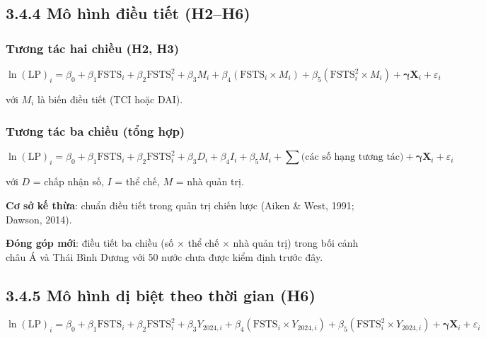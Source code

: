 \documentclass[
  a4paper,
  13pt]{extreport}
\begin{document}
\hypertarget{muxf4-huxecnh-ux111iux1ec1u-tiux1ebft-h2h6}{%
\subsection{3.4.4 Mô hình điều tiết
(H2--H6)}\label{muxf4-huxecnh-ux111iux1ec1u-tiux1ebft-h2h6}}

\hypertarget{tux1b0ux1a1ng-tuxe1c-hai-chiux1ec1u-h2-h3}{%
\subsubsection{Tương tác hai chiều (H2,
H3)}\label{tux1b0ux1a1ng-tuxe1c-hai-chiux1ec1u-h2-h3}}

\[\ln(\mathrm{LP})_i = \beta_0 + \beta_1 \mathrm{FSTS}_i + \beta_2 \mathrm{FSTS}_i^{2} + \beta_3 M_i + \beta_4 (\mathrm{FSTS}_i \times M_i) + \beta_5 (\mathrm{FSTS}_i^{2} \times M_i) + \boldsymbol{\gamma} \mathbf{X}_i + \varepsilon_i\]

với \(M_i\) là biến điều tiết (TCI hoặc DAI).

\hypertarget{tux1b0ux1a1ng-tuxe1c-ba-chiux1ec1u-tux1ed5ng-hux1ee3p}{%
\subsubsection{Tương tác ba chiều (tổng
hợp)}\label{tux1b0ux1a1ng-tuxe1c-ba-chiux1ec1u-tux1ed5ng-hux1ee3p}}

\[\ln(\mathrm{LP})_i = \beta_0 + \beta_1 \mathrm{FSTS}_i + \beta_2 \mathrm{FSTS}_i^{2} + \beta_3 D_i + \beta_4 I_i + \beta_5 M_i + \sum \text{(các số hạng tương tác)} + \boldsymbol{\gamma} \mathbf{X}_i + \varepsilon_i\]

với \(D\) = chấp nhận số, \(I\) = thể chế, \(M\) = nhà quản trị.

\textbf{Cơ sở kế thừa}: chuẩn điều tiết trong quản trị chiến lược (Aiken
\& West, 1991; Dawson, 2014).

\textbf{Đóng góp mới}: điều tiết ba chiều (số × thể chế × nhà quản trị)
trong bối cảnh châu Á và Thái Bình Dương với 50 nước chưa được kiểm định
trước đây.

\hypertarget{muxf4-huxecnh-dux1ecb-biux1ec7t-theo-thux1eddi-gian-h6}{%
\subsection{3.4.5 Mô hình dị biệt theo thời gian
(H6)}\label{muxf4-huxecnh-dux1ecb-biux1ec7t-theo-thux1eddi-gian-h6}}

\[\ln(\mathrm{LP})_i = \beta_0 + \beta_1 \mathrm{FSTS}_i + \beta_2 \mathrm{FSTS}_i^{2} + \beta_3 Y_{2024,i} + \beta_4 (\mathrm{FSTS}_i \times Y_{2024,i}) + \beta_5 (\mathrm{FSTS}_i^{2} \times Y_{2024,i}) + \boldsymbol{\gamma} \mathbf{X}_i + \varepsilon_i\]
\end{document}
